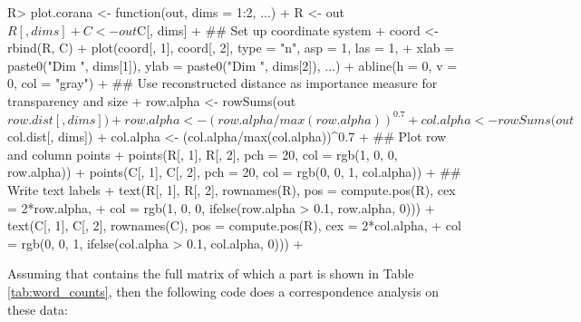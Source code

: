 \documentclass[
]{jdssv}
\begin{document}
\begin{CodeChunk}
\begin{CodeInput}
R> plot.corana <- function(out, dims = 1:2, ...){
+   R <- out$R[, dims]
+   C <- out$C[, dims]
+   ## Set up coordinate system
+   coord <- rbind(R, C)
+   plot(coord[, 1], coord[, 2], type = "n", asp = 1, las = 1,
+        xlab = paste0("Dim ", dims[1]), ylab = paste0("Dim ", dims[2]), ...)
+   abline(h = 0, v = 0, col = "gray")
+   ## Use reconstructed distance as importance measure for transparency and size
+   row.alpha <- rowSums(out$row.dist[, dims])
+   row.alpha <- (row.alpha/max(row.alpha))^0.7
+   col.alpha <- rowSums(out$col.dist[, dims])
+   col.alpha <- (col.alpha/max(col.alpha))^0.7
+   ## Plot row and column points 
+   points(R[, 1], R[, 2], pch = 20, col = rgb(1, 0, 0, row.alpha))
+   points(C[, 1], C[, 2], pch = 20, col = rgb(0, 0, 1, col.alpha))
+   ## Write text labels
+   text(R[, 1], R[, 2], rownames(R), pos = compute.pos(R), cex = 2*row.alpha,
+        col = rgb(1, 0, 0, ifelse(row.alpha > 0.1, row.alpha, 0)))
+   text(C[, 1], C[, 2], rownames(C), pos = compute.pos(R), cex = 2*col.alpha,
+        col = rgb(0, 0, 1, ifelse(col.alpha > 0.1, col.alpha, 0)))
+ }
\end{CodeInput}
\end{CodeChunk}

Assuming that  contains the full matrix of which a
part is shown in Table \ref*{tab:word_counts}, then the following code
does a correspondence analysis on these data:
\end{document}
